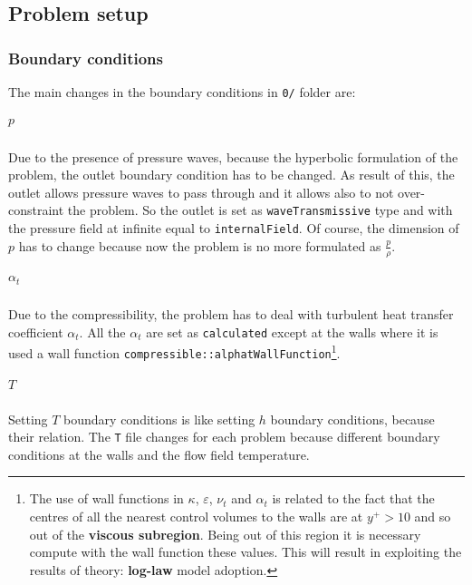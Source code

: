 

\subsection{Problem setup}
\subsubsection{Boundary conditions}
The main changes in the boundary conditions in \verb|0/| folder are:
\subparagraph{$p$} Due to the presence of pressure waves, because the hyperbolic formulation of the problem, the outlet boundary condition has to be changed. As result of this, the outlet allows pressure waves to pass through and it allows also to not over-constraint the problem. So the outlet is set as \verb|waveTransmissive| type and with the pressure field at infinite equal to \verb|internalField|. Of course, the dimension of $p$ has to change because now the problem is no more formulated as $\frac{p}{\rho}$. 
\subparagraph{$\alpha_t$} Due to the compressibility, the problem has to deal with turbulent heat transfer coefficient $\alpha_t$. All the $\alpha_t$ are set as \verb|calculated| except at the walls where it is used a wall function \verb|compressible::alphatWallFunction|\footnote{The use of wall functions in $\kappa$, $\varepsilon$, $\nu_t$ and $\alpha_t$ is related to the fact that the centres of all the nearest control volumes to the walls are at $y^+ > 10$ and so out of the \textbf{viscous subregion}. Being out of this region it is necessary compute with the wall function these values. This will result in exploiting the results of theory: \textbf{log-law} model adoption.}.   
\subparagraph{$T$} Setting $T$ boundary conditions is like setting $h$ boundary conditions, because their relation. The \verb|T| file changes for each problem because different boundary conditions at the walls and the flow field temperature.

